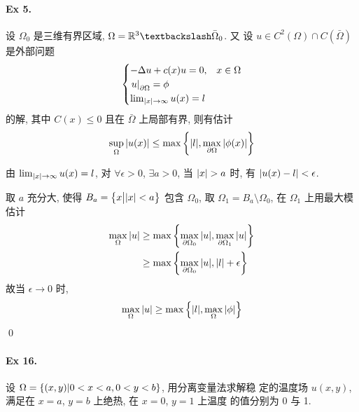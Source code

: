 \paragraph{Ex 5.}
设 $\Omega_0$ 是三维有界区域, $\Omega = \mreal^3\textbackslash\bar\Omega_0$. 又
设 $u \in C^2(\Omega) \cap C(\bar\Omega)$ 是外部问题
\[ \begin{cases}
-\Delta u + c(x) u = 0, & x \in \Omega \\
{\left.{u} \right|}_{\partial\Omega} = \phi \\
\lim_{{\lvert {x} \rvert} \to \infty} u(x) = l
\end{cases} \]
的解, 其中 $C(x) \leq 0$ 且在 $\bar\Omega$ 上局部有界, 则有估计
\[ \sup_{\Omega} {\lvert {u(x)} \rvert} \leq \max {\left\{ {
    {\lvert {l} \rvert}, \max_{\partial\Omega} {\lvert {\phi(x)} \rvert}
} \right\}} \]

\begin{solution}
由 $\lim_{{\lvert {x} \rvert} \to \infty} u(x) = l$, 对 $\forall\epsilon>0$, $\exists a>0$,
当 ${\lvert {x} \rvert}>a$ 时, 有 ${\lvert {u(x)-l} \rvert}<\epsilon$.

取 $a$ 充分大, 使得 $B_a = \big\{x \big| {\lvert {x} \rvert} < a\big\}$ 包含 $\Omega_0$, 取
$\Omega_1 = B_a \setminus \Omega_0$, 在 $\Omega_1$ 上用最大模估计
\begin{align*}
\max_{\Omega}{\lvert {u} \rvert} &\geq \max{\left\{ {
    \max_{\partial\Omega_0}{\lvert {u} \rvert}, \max_{\partial\Omega_1}{\lvert {u} \rvert}
} \right\}} \\
&\geq \max{\left\{ {
    \max_{\partial\Omega_0}{\lvert {u} \rvert}, {\lvert {l} \rvert} + \epsilon
} \right\}}
\end{align*}
故当 $\epsilon \to 0$ 时, 
\[ \max_\Omega{\lvert {u} \rvert} \geq \max{\left\{ {{\lvert {l} \rvert},\max_\Omega{\lvert {\phi} \rvert}} \right\}} \]
\qed
\end{solution}
\paragraph{Ex 16.}
设 $\Omega = {\left\{ {(x, y) | 0 < x < a, 0 < y < b} \right\}}$, 用分离变量法求解稳
定的温度场 $u(x, y)$, 满足在 $x = a$, $y = b$ 上绝热, 在 $x = 0$, $y = 1$ 上温度
的值分别为 0 与 1.

